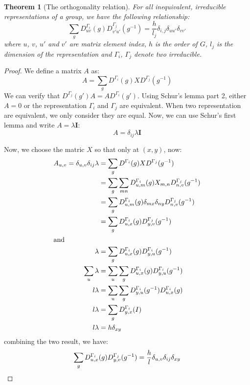 \documentclass{amsart}
\newtheorem*{theorem}{Theorem}
\theoremstyle{remark}
\theoremstyle{remark}
\theoremstyle{definition}
\begin{document}
\begin{theorem}
    [The orthogonality relation]
    For all inequivalent, irreducible representations of a group, we have the following relationship:
    \begin{equation*}
        \sum_g D^{\Gamma_i}_{uv}(g)D^{\Gamma_j}_{v'u'}(g^{-1}) = \frac{h}{l_j} \delta_{i,j}\delta_{uu'}\delta_{vv'}
    \end{equation*}
    where $u$, $v$, $u'$ and $v'$ are matrix element index, $h$ is the order of $G$, $l_j$ is the dimension of 
    the representation and $\Gamma_i$, $\Gamma_j$ denote two irreducible.
\end{theorem}
\begin{proof}
We define a matrix $A$ as:
\begin{equation*}
    A = \sum_{g} D^{\Gamma_i}(g) X D^{\Gamma_j}(g^{-1})
\end{equation*}
We can verify that $D^{\Gamma_j}(g')A = A D^{\Gamma_i}(g')$. Using Schur's lemma part 2, 
either $A=0$ or the representation $\Gamma_i$ and $\Gamma_j$ are equivalent. When two representation 
are equivalent, we only consider they are equal. 
Now, we can use Schur's first lemma and write $A = \lambda \mathbf{I}$:
\begin{equation*}
    A = \delta_{ij} \lambda \mathbf{I}
\end{equation*}

Now, we choose the matric $X$ so that only at $(x,y)$, now:
\begin{align*}
    A_{u,v} = \delta_{u,v} \delta_{ij} \lambda 
    &= \sum_{g} D^{\Gamma_i}(g) X D^{\Gamma_j}(g^{-1}) \\
    &= \sum_{g} \sum_{mn} D^{\Gamma_i}_{u,m}(g) X_{m,n} D^{\Gamma_j}_{n,v}(g^{-1}) \\
    &= \sum_{g}  D^{\Gamma_i}_{u,m}(g) \delta_{mx}\delta_{ny} D^{\Gamma_j}_{n,v}(g^{-1}) \\
    &= \sum_{g}  D^{\Gamma_i}_{u,x}(g) D^{\Gamma_j}_{y,v}(g^{-1}) \\
\intertext{and}
    \lambda &= \sum_{g}  D^{\Gamma_i}_{u,x}(g) D^{\Gamma_i}_{y,u}(g^{-1}) \\ 
    \sum_u \lambda &= \sum_u \sum_{g}  D^{\Gamma_i}_{u,x}(g) D^{\Gamma_i}_{y,u}(g^{-1}) \\
    l\lambda &= \sum_u \sum_{g} D^{\Gamma_i}_{y,u}(g^{-1}) D^{\Gamma_i}_{u,x}(g) \\
    l\lambda &= \sum_{g} D^{\Gamma_i}_{y,x}(I) \\
    l\lambda &= h\delta_{xy} \\
\end{align*}
combining the two result, we have:
\begin{equation*}
    \sum_{g}  D^{\Gamma_i}_{u,x}(g) D^{\Gamma_j}_{y,v}(g^{-1}) 
    = \frac{h}{l} \delta_{u,v} \delta_{ij} \delta_{xy} \qedhere
\end{equation*}
\end{proof}
\end{document}

